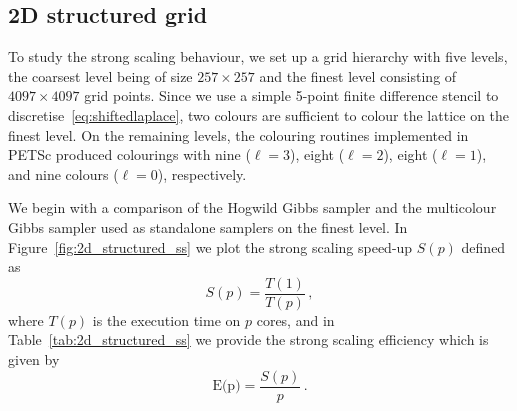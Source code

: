 \documentclass[
fontsize=11pt,
paper=a4,
numbers=noenddot
]{scrartcl}
\begin{document}
\subsection{2D structured grid}
To study the strong scaling behaviour, we set up a grid hierarchy with five levels, the coarsest level being of size $257 \times 257$ and the finest level consisting of $4097 \times 4097$ grid points. Since we use a simple 5-point finite difference stencil to discretise~\eqref{eq:shiftedlaplace}, two colours are sufficient to colour the lattice on the finest level. On the remaining levels, the colouring routines implemented in PETSc produced colourings with nine ($\ell = 3$), eight ($\ell = 2$), eight ($\ell = 1$), and nine colours ($\ell = 0$), respectively.

We begin with a comparison of the Hogwild Gibbs sampler and the multicolour Gibbs sampler used as standalone samplers on the finest level. In Figure~\ref{fig:2d_structured_ss} we plot the strong scaling speed-up $S(p)$ defined as
\begin{equation*}
    S(p) = \frac{T(1)}{T(p)}\,,
\end{equation*}
where $T(p)$ is the execution time on $p$ cores, and in Table~\ref{tab:2d_structured_ss} we provide the strong scaling efficiency which is given by
\begin{equation*}
    \text{E(p)} = \frac{S(p)}{p}\,.
\end{equation*}
\end{document}
